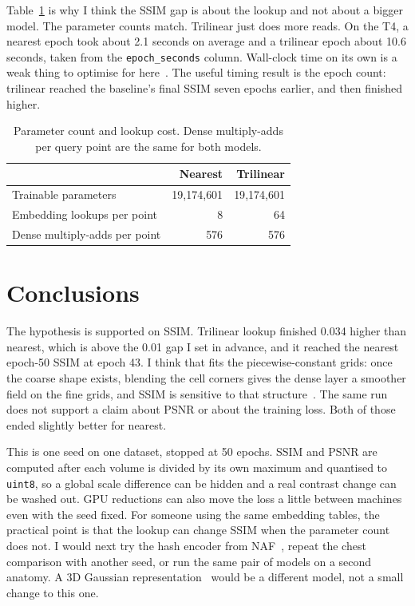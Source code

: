 \documentclass[11pt,a4paper]{article}
\begin{document}
Table~\ref{tab:cost} is why I think the SSIM gap is about the lookup and not about a bigger model.
The parameter counts match.
Trilinear just does more reads.
On the T4, a nearest epoch took about 2.1 seconds on average and a trilinear epoch about 10.6 seconds, taken from the \texttt{epoch\_seconds} column.
Wall-clock time on its own is a weak thing to optimise for here~\cite{cosc440brief2026}.
The useful timing result is the epoch count: trilinear reached the baseline's final SSIM seven epochs earlier, and then finished higher.

\begin{table}[ht]
  \centering
  \caption{Parameter count and lookup cost. Dense multiply-adds per query point are the same for both models.}
  \label{tab:cost}
  \begin{tabular}{lrr}
    \toprule
    & Nearest & Trilinear \\
    \midrule
    Trainable parameters & 19{,}174{,}601 & 19{,}174{,}601 \\
    Embedding lookups per point & 8 & 64 \\
    Dense multiply-adds per point & 576 & 576 \\
    \bottomrule
  \end{tabular}
\end{table}

\section{Conclusions}
The hypothesis is supported on SSIM.
Trilinear lookup finished 0.034 higher than nearest, which is above the 0.01 gap I set in advance, and it reached the nearest epoch-50 SSIM at epoch 43.
I think that fits the piecewise-constant grids: once the coarse shape exists, blending the cell corners gives the dense layer a smoother field on the fine grids, and SSIM is sensitive to that structure~\cite{atlaslec8ssim}.
The same run does not support a claim about PSNR or about the training loss.
Both of those ended slightly better for nearest.

This is one seed on one dataset, stopped at 50 epochs.
SSIM and PSNR are computed after each volume is divided by its own maximum and quantised to \texttt{uint8}, so a global scale difference can be hidden and a real contrast change can be washed out.
GPU reductions can also move the loss a little between machines even with the seed fixed.
For someone using the same embedding tables, the practical point is that the lookup can change SSIM when the parameter count does not.
I would next try the hash encoder from NAF~\cite{zha2022naf}, repeat the chest comparison with another seed, or run the same pair of models on a second anatomy.
A 3D Gaussian representation~\cite{3dgrct2024} would be a different model, not a small change to this one.



\end{document}
